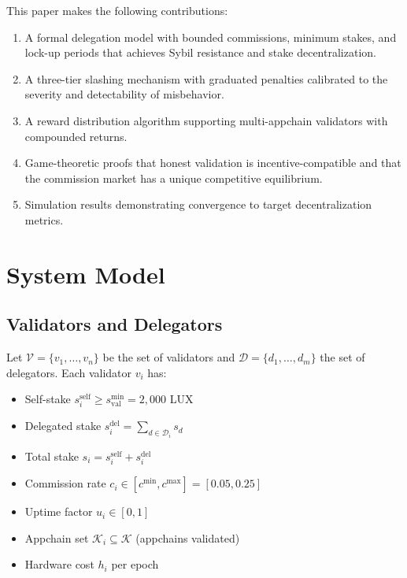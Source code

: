 \documentclass[11pt,a4paper]{article}
\begin{document}
This paper makes the following contributions:

\begin{enumerate}[label=(\roman*)]
    \item A formal delegation model with bounded commissions, minimum stakes, and lock-up periods that achieves Sybil resistance and stake decentralization.
    \item A three-tier slashing mechanism with graduated penalties calibrated to the severity and detectability of misbehavior.
    \item A reward distribution algorithm supporting multi-appchain validators with compounded returns.
    \item Game-theoretic proofs that honest validation is incentive-compatible and that the commission market has a unique competitive equilibrium.
    \item Simulation results demonstrating convergence to target decentralization metrics.
\end{enumerate}

\section{System Model}\label{sec:model}

\subsection{Validators and Delegators}

Let $\mathcal{V} = \{v_1, \ldots, v_n\}$ be the set of validators and $\mathcal{D} = \{d_1, \ldots, d_m\}$ the set of delegators. Each validator $v_i$ has:
\begin{itemize}
    \item Self-stake $s_i^{\text{self}} \geq s^{\min}_{\text{val}} = 2{,}000$ LUX
    \item Delegated stake $s_i^{\text{del}} = \sum_{d \in \mathcal{D}_i} s_d$
    \item Total stake $s_i = s_i^{\text{self}} + s_i^{\text{del}}$
    \item Commission rate $c_i \in [c^{\min}, c^{\max}] = [0.05, 0.25]$
    \item Uptime factor $u_i \in [0, 1]$
    \item Appchain set $\mathcal{K}_i \subseteq \mathcal{K}$ (appchains validated)
    \item Hardware cost $h_i$ per epoch
\end{itemize}
\end{document}
